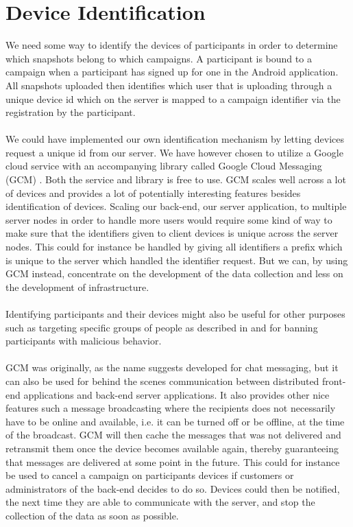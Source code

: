 
\section{Device Identification}
\label{sec:device_identification}

We need some way to identify the devices of participants in order to determine which snapshots belong to which campaigns. A participant is bound to a campaign when a participant has signed up for one in the Android application. All snapshots uploaded then identifies which user that is uploading through a unique device id which on the server is mapped to a campaign identifier via the registration by the participant. 
\\\\
We could have implemented our own identification mechanism by letting devices request a unique id from our server. We have however chosen to utilize a Google cloud service with an accompanying library called Google Cloud Messaging (GCM) \parencite{google_cloud_messaging}. Both the service and library is free to use. GCM scales well across a lot of devices and provides a lot of potentially interesting features besides identification of devices. Scaling our back-end, our server application, to multiple server nodes in order to handle more users would require some kind of way to make sure that the identifiers given to client devices is unique across the server nodes. This could for instance be handled by giving all identifiers a prefix which is unique to the server which handled the identifier request. But we can, by using GCM instead, concentrate on the development of the data collection and less on the development of infrastructure.
\\\\
Identifying participants and their devices might also be useful for other purposes such as targeting specific groups of people as described in  and for banning participants with malicious behavior. 
\\\\
GCM was originally, as the name suggests developed for chat messaging, but it can also be used for behind the scenes communication between distributed front-end applications and back-end server applications. It also provides other nice features such a message broadcasting where the recipients does not necessarily have to be online and available, i.e. it can be turned off or be offline, at the time of the broadcast. GCM will then cache the messages that was not delivered and retransmit them once the device becomes available again, thereby guaranteeing that messages are delivered at some point in the future. This could for instance be used to cancel a campaign on participants devices if customers or administrators of the back-end decides to do so. Devices could then be notified, the next time they are able to communicate with the server, and stop the collection of the data as soon as possible. 
